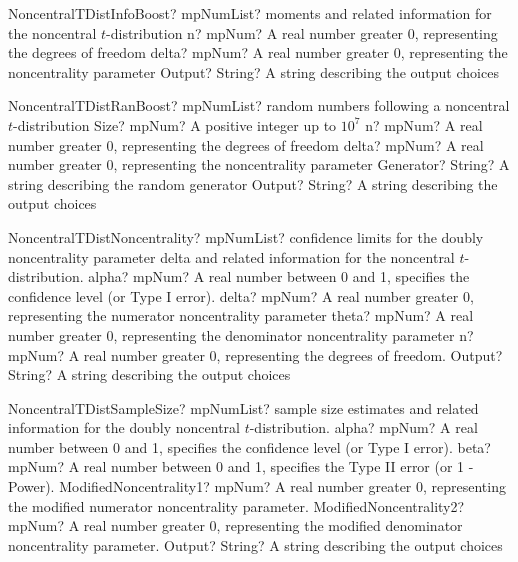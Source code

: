 \documentclass[12pt,a4paper,openany]{book}
\begin{document}
\begin{mpFunctionsExtract}
\mpFunctionThreeNotImplemented
{NoncentralTDistInfoBoost? mpNumList? moments and related information for the noncentral $t$-distribution}
{n? mpNum? A real number greater 0, representing the degrees of freedom}
{delta? mpNum? A real number greater 0, representing the noncentrality parameter}
{Output? String? A string describing the output choices}
\end{mpFunctionsExtract}

\begin{mpFunctionsExtract}
\mpFunctionFiveNotImplemented
{NoncentralTDistRanBoost? mpNumList? random numbers following a noncentral $t$-distribution}
{Size? mpNum? A positive integer up to $10^7$}
{n? mpNum? A real number greater 0, representing the degrees of freedom}
{delta? mpNum? A real number greater 0, representing the noncentrality parameter}
{Generator? String? A string describing the random generator}
{Output? String? A string describing the output choices}
\end{mpFunctionsExtract}

\begin{mpFunctionsExtract}
\mpFunctionFiveNotImplemented
{NoncentralTDistNoncentrality? mpNumList? confidence limits for the doubly noncentrality parameter delta and related information for the noncentral $t$-distribution.}
{alpha? mpNum? A real number between 0 and 1, specifies the confidence level (or Type I error).}
{delta? mpNum? A real number greater 0, representing the numerator noncentrality parameter}
{theta? mpNum? A real number greater 0, representing the denominator noncentrality parameter}
{n? mpNum? A real number greater 0, representing the degrees of freedom.}
{Output? String? A string describing the output choices}
\end{mpFunctionsExtract}

\begin{mpFunctionsExtract}
\mpFunctionFiveNotImplemented
{NoncentralTDistSampleSize? mpNumList? sample size estimates and related information for the doubly noncentral $t$-distribution.}
{alpha? mpNum? A real number between 0 and 1, specifies the confidence level (or Type I error).}
{beta? mpNum?  A real number between 0 and 1, specifies the Type II error (or 1 - Power).}
{ModifiedNoncentrality1? mpNum? A real number greater 0, representing the modified numerator noncentrality parameter.}
{ModifiedNoncentrality2? mpNum? A real number greater 0, representing the modified denominator noncentrality parameter.}
{Output? String? A string describing the output choices}
\end{mpFunctionsExtract}
\end{document}
